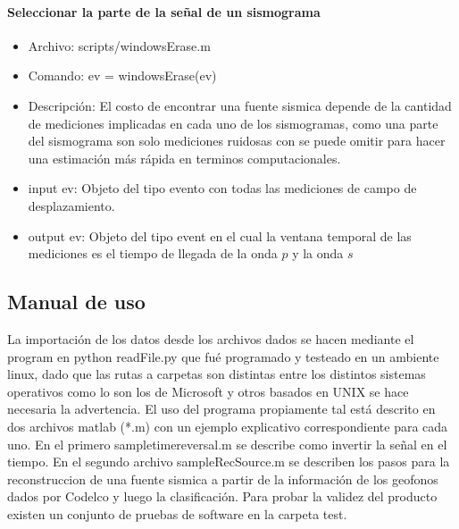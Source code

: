 \paragraph{Seleccionar la parte de la señal de un sismograma}
\begin{itemize}
  \item Archivo: scripts/windowsErase.m
  \item Comando: ev =  windowsErase(ev)
  \item Descripción: El costo de encontrar una fuente sismica depende de la
  cantidad de mediciones implicadas en cada uno de los sismogramas, como una
  parte del sismograma son solo mediciones ruidosas con se puede omitir para
  hacer una estimación más rápida en terminos computacionales.
  \item input ev: Objeto del tipo evento con todas las mediciones de campo de
  desplazamiento.
  \item output ev: Objeto del tipo event en el cual la ventana temporal de las
  mediciones es el tiempo de llegada de la onda $p$ y la onda $s$
\end{itemize}

\subsection{Manual de uso}
La importación de los datos desde los archivos dados se hacen mediante el
program en python readFile.py que fué programado y testeado en un ambiente
linux, dado que las rutas a carpetas son distintas entre los distintos sistemas
operativos como lo son los de Microsoft y otros basados en UNIX se hace
necesaria la advertencia.
El uso del programa propiamente tal está descrito en dos archivos matlab (*.m)
con un ejemplo explicativo correspondiente para cada uno. En el primero
sampletimereversal.m se describe como invertir la señal en el tiempo. En el 
segundo archivo sampleRecSource.m se describen los pasos para la reconstruccion 
de una fuente sismica a partir de la información de los geofonos dados por 
Codelco y luego la clasificación.
Para probar la validez del producto existen un conjunto de pruebas de software
en la carpeta test.






















